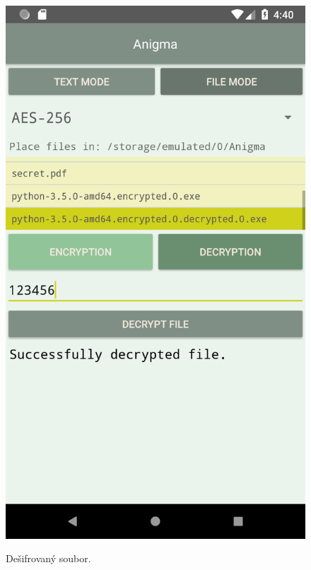 \documentclass[12pt, a4paper]{article}
\begin{document}
\begin{figure}[h]
\caption{Dešifrovaný soubor.}
\centering
\includegraphics[height=0.4\textheight]{file_dec_success}
\label{fig:file_dec_success}
\end{figure}
\end{document}
